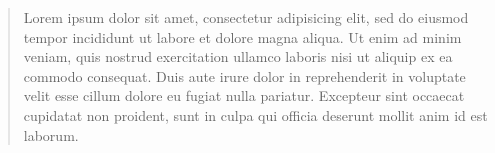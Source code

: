 \documentclass{article}
\begin{document}
\begingroup
  \beginnumbering

    \pstart
    \lipsum[1]
    \pend

    \begin{quotation}
    \pstart
    Lorem ipsum dolor sit amet, consectetur adipisicing elit, sed do eiusmod tempor incididunt ut labore et dolore magna aliqua. Ut enim ad minim veniam, quis nostrud exercitation ullamco laboris nisi ut aliquip ex ea commodo consequat. Duis aute irure dolor in reprehenderit in voluptate velit esse cillum dolore eu fugiat nulla pariatur. Excepteur sint occaecat cupidatat non proident, sunt in culpa qui officia deserunt mollit anim id est laborum.
    \pend
    \end{quotation}

    \pstart
    \lipsum[3]
    \pend

  \endnumbering
\endgroup
\end{document}
